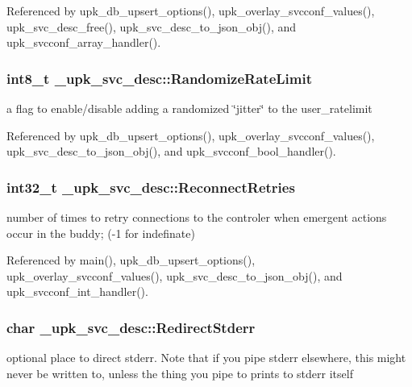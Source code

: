 Referenced by upk\_\-db\_\-upsert\_\-options(), upk\_\-overlay\_\-svcconf\_\-values(), upk\_\-svc\_\-desc\_\-free(), upk\_\-svc\_\-desc\_\-to\_\-json\_\-obj(), and upk\_\-svcconf\_\-array\_\-handler().

\subsubsection[{RandomizeRateLimit}]{\setlength{\rightskip}{0pt plus 5cm}int8\_\-t {\bf \_\-upk\_\-svc\_\-desc::RandomizeRateLimit}}\label{struct__upk__svc__desc_af203541b3c86af36abe8f91e4a1df8bf}
a flag to enable/disable adding a randomized \char`\"{}jitter\char`\"{} to the user\_\-ratelimit 

Referenced by upk\_\-db\_\-upsert\_\-options(), upk\_\-overlay\_\-svcconf\_\-values(), upk\_\-svc\_\-desc\_\-to\_\-json\_\-obj(), and upk\_\-svcconf\_\-bool\_\-handler().

\subsubsection[{ReconnectRetries}]{\setlength{\rightskip}{0pt plus 5cm}int32\_\-t {\bf \_\-upk\_\-svc\_\-desc::ReconnectRetries}}\label{struct__upk__svc__desc_a60cd2b44fbc61ec4d657e896fd9de6e8}
number of times to retry connections to the controler when emergent actions occur in the buddy; (-\/1 for indefinate) 

Referenced by main(), upk\_\-db\_\-upsert\_\-options(), upk\_\-overlay\_\-svcconf\_\-values(), upk\_\-svc\_\-desc\_\-to\_\-json\_\-obj(), and upk\_\-svcconf\_\-int\_\-handler().

\subsubsection[{RedirectStderr}]{\setlength{\rightskip}{0pt plus 5cm}char {\bf \_\-upk\_\-svc\_\-desc::RedirectStderr}}\label{struct__upk__svc__desc_a786f850296d5348861c07d14f149f830}
optional place to direct stderr. Note that if you pipe stderr elsewhere, this might never be written to, unless the thing you pipe to prints to stderr itself 

